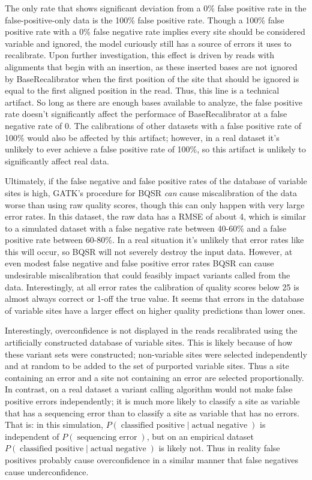 The only rate that shows significant deviation from a 0\% false positive rate in the false-positive-only data is the 100\% false positive rate. Though a 100\% false positive rate with a 0\% false negative rate implies every site should be considered variable and ignored, the model curiously still has a source of errors it uses to recalibrate. Upon further investigation, this effect is driven by reads with alignments that begin with an insertion, as these inserted bases are not ignored by BaseRecalibrator when the first position of the site that should be ignored is equal to the first aligned position in the read. Thus, this line is a technical artifact. So long as there are enough bases available to analyze, the false positive rate doesn't significantly affect the performace of BaseRecalibrator at a false negative rate of 0. The calibrations of other datasets with a false positive rate of 100\% would also be affected by this artifact; however, in a real dataset it's unlikely to ever achieve a false positive rate of 100\%, so this artifact is unlikely to significantly affect real data.

Ultimately, if the false negative and false positive rates of the database of variable sites is high, GATK's procedure for BQSR \textit{can} cause miscalibration of the data worse than using raw quality scores, though this can only happen with very large error rates. In this dataset, the raw data has a RMSE of about 4, which is similar to a simulated dataset with a false negative rate between 40-60\% and a false positive rate between 60-80\%. In a real situation it's unlikely that error rates like this will occur, so BQSR will not severely destroy the input data. However, at even modest false negative and false positive error rates BQSR can cause undesirable miscalibration that could feasibly impact variants called from the data. Interestingly, at all error rates the calibration of quality scores below 25 is almost always correct or 1-off the true value. It seems that errors in the database of variable sites have a larger effect on higher quality predictions than lower ones.

Interestingly, overconfidence is not displayed in the reads recalibrated using the artificially constructed database of variable sites. This is likely because of how these variant sets were constructed; non-variable sites were selected independently and at random to be added to the set of purported variable sites. Thus a site containing an error and a site not containing an error are selected proportionally. In contrast, on a real dataset a variant calling algorithm would not make false positive errors independently; it is much more likely to classify a site as variable that has a sequencing error than to classify a site as variable that has no errors. That is: in this simulation, $P(\operatorname{classified\:positive} | \operatorname{actual\:negative})$ is independent of $P(\operatorname{sequencing\:error})$, but on an empirical dataset $P(\operatorname{classified\:positive} | \operatorname{actual\:negative})$ is likely not. Thus in reality false positives probably cause overconfidence in a similar manner that false negatives cause underconfidence.

